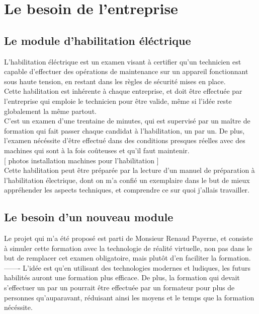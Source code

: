 \documentclass[a4paper]{article}
\begin{document}
    \section{Le besoin de l'entreprise}
    \subsection{Le module d'habilitation éléctrique}

        L'habilitation éléctrique est un examen visant à certifier qu'un technicien est capable d'effectuer des opérations de maintenance sur un appareil fonctionnant sous haute tension, en restant dans les règles de sécurité mises en place. \\

        Cette habilitation est inhérente à chaque entreprise, et doit être effectuée par l'entreprise qui emploie le technicien pour être valide, même si l'idée reste globalement la même partout. \\

        C'est un examen d'une trentaine de minutes, qui est supervisé par un maître de formation qui fait passer chaque candidat à l'habilitation, un par un. De plus, l'examen nécéssite d'être effectué dans des conditions presques réelles avec des machines qui sont à la fois coûteuses et qu'il faut maintenir. \\

        [ photos installation machines pour l'habilitation ] \\

        Cette habilitation peut être préparée par la lecture d'un manuel de préparation à l'habilitation électrique, dont on m'a confié un exemplaire dans le but de mieux appréhender les aspects techniques, et comprendre ce sur quoi j'allais travailler.

    \subsection{Le besoin d'un nouveau module}

        Le projet qui m'a été proposé est parti de Monsieur Renaud Payerne, et consiste à simuler cette formation avec la technologie de réalité virtuelle, non pas dans le but de remplacer cet examen obligatoire, mais plutôt d'en faciliter la formation. \\

        ------- L'idée est qu'en utilisant des technologies modernes et ludiques, les futurs habilités auront une formation plus efficace. De plus, la formation qui devait s'effectuer un par un pourrait être effectuée par un formateur pour plus de personnes qu'auparavant, réduisant ainsi les moyens et le temps que la formation nécéssite. \\
\end{document}
